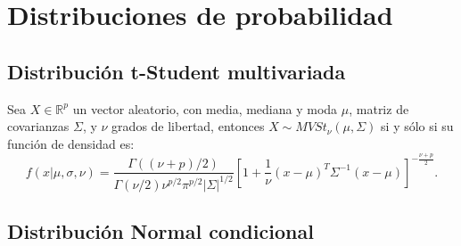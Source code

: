 \chapter[Distribuciones de probabilidad]{Distribuciones de probabilidad }\label{chap:Distributions}

\section{Distribuci\'on t-Student multivariada}

\begin{defin*}
    Sea $X \in \mathbb{R}^p$ un vector aleatorio, con media, mediana y moda $\mu$, matriz de covarianzas $\Sigma $, y $\nu$ grados de libertad, entonces $X \sim MVSt_{\nu}(\mu,\Sigma)$ si y s\'olo si su funci\'on de densidad es:
\begin{equation*}
    f(x|\mu,\sigma,\nu) = 
    \frac{\Gamma((\nu+p)/2)}{\Gamma(\nu/2)\nu^{p/2}\pi^{p/2}|\Sigma|^{1/2}}
    \left[1 + \frac{1}{\nu} (x-\mu)^T\Sigma^{-1}(x-\mu)\right]^{-\frac{\nu+p}{2}}.
\end{equation*}
\end{defin*}

\section{Distribuci\'on Normal condicional}

